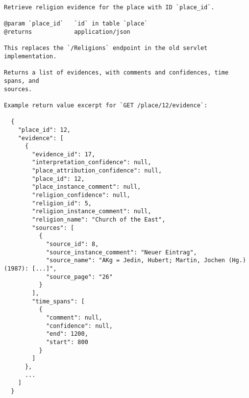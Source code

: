 {\small\begin{verbatim}Retrieve religion evidence for the place with ID `place_id`.

@param `place_id`   `id` in table `place`
@returns            application/json

This replaces the `/Religions` endpoint in the old servlet implementation.

Returns a list of evidences, with comments and confidences, time spans, and
sources.

Example return value excerpt for `GET /place/12/evidence`:

  {
    "place_id": 12,
    "evidence": [
      {
        "evidence_id": 17,
        "interpretation_confidence": null,
        "place_attribution_confidence": null,
        "place_id": 12,
        "place_instance_comment": null,
        "religion_confidence": null,
        "religion_id": 5,
        "religion_instance_comment": null,
        "religion_name": "Church of the East",
        "sources": [
          {
            "source_id": 8,
            "source_instance_comment": "Neuer Eintrag",
            "source_name": "AKg = Jedin, Hubert; Martin, Jochen (Hg.) (1987): [...]",
            "source_page": "26"
          }
        ],
        "time_spans": [
          {
            "comment": null,
            "confidence": null,
            "end": 1200,
            "start": 800
          }
        ]
      },
      ...
    ]
  }
\end{verbatim}}
\nopagebreak[4]
